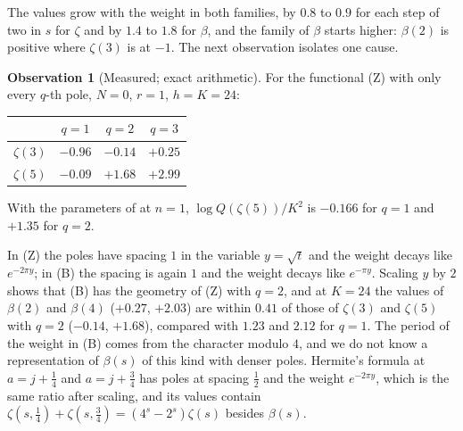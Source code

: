 \documentclass[11pt]{article}
\theoremstyle{definition}
\newtheorem{observation}[theorem]{Observation}
\begin{document}
The values grow with the weight in both families, by $0.8$ to $0.9$ for each step of two in $s$ for $\zeta$ and by $1.4$ to $1.8$ for $\beta$, and the family of $\beta$ starts higher: $\beta(2)$ is positive where $\zeta(3)$ is at $-1$. The next observation isolates one cause.

\begin{observation}[Measured; exact arithmetic]\label{obs:fzstep}
For the functional (Z) with only every $q$-th pole, $N=0$, $r=1$, $h=K=24$:
\begin{center}
\small
\begin{tabular}{lccc}
\toprule
& $q=1$ & $q=2$ & $q=3$\\
\midrule
$\zeta(3)$ & $-0.96$ & $-0.14$ & $+0.25$\\
$\zeta(5)$ & $-0.09$ & $+1.68$ & $+2.99$\\
\bottomrule
\end{tabular}
\end{center}
With the parameters of \cite{Fauzan} at $n=1$, $\log Q(\zeta(5))/K^2$ is $-0.166$ for $q=1$ and $+1.35$ for $q=2$.
\end{observation}

In (Z) the poles have spacing $1$ in the variable $y=\sqrt t$ and the weight decays like $e^{-2\pi y}$; in (B) the spacing is again $1$ and the weight decays like $e^{-\pi y}$. Scaling $y$ by $2$ shows that (B) has the geometry of (Z) with $q=2$, and at $K=24$ the values of $\beta(2)$ and $\beta(4)$ ($+0.27$, $+2.03$) are within $0.41$ of those of $\zeta(3)$ and $\zeta(5)$ with $q=2$ ($-0.14$, $+1.68$), compared with $1.23$ and $2.12$ for $q=1$. The period of the weight in (B) comes from the character modulo $4$, and we do not know a representation of $\beta(s)$ of this kind with denser poles. Hermite's formula at $a=j+\frac14$ and $a=j+\frac34$ has poles at spacing $\frac12$ and the weight $e^{-2\pi y}$, which is the same ratio after scaling, and its values contain $\zeta(s,\frac14)+\zeta(s,\frac34)=(4^s-2^s)\zeta(s)$ besides $\beta(s)$.
\end{document}
